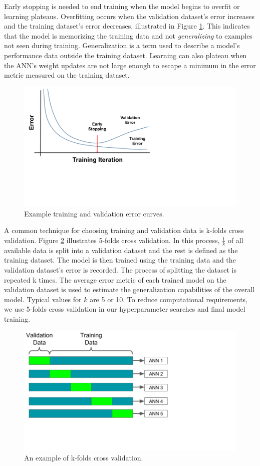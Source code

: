 Early stopping is needed to end training when the model begins to overfit or learning plateaus. Overfitting occurs when the validation dataset's error increases and the training dataset's error decreases, illustrated in Figure \ref{fig:training_testing_error}. This indicates that the model is memorizing the training data and not \textit{generalizing} to examples not seen during training. Generalization is a term used to describe a model's performance data outside the training dataset. Learning can also plateau when the ANN's weight updates are not large enough to escape a minimum in the error metric measured on the training dataset.

\begin{figure}[H]
	\centering
	\includegraphics[trim=0 190 390 0,clip,width=0.7\linewidth]{images/training_testing_error_v2}
	\caption{Example training and validation error curves.}
	\label{fig:training_testing_error}
\end{figure}

A common technique for choosing training and validation data is k-folds cross validation. Figure \ref{fig:kfolds} illustrates 5-folds cross validation. In this process, $\frac{1}{k}$ of all available data is split into a validation dataset and the rest is defined as the training dataset. The model is then trained using the training data and the validation dataset's error is recorded. The process of splitting the dataset is repeated k times. The average error metric of each trained model on the validation dataset is used to estimate the generalization capabilities of the overall model. Typical values for $k$ are 5 or 10. To reduce computational requirements, we use 5-folds cross validation in our hyperparameter searches and final model training. 


\begin{figure}[H]
	\centering
	\includegraphics[trim=0 140 310 0,clip,width=0.7\linewidth]{images/kfolds}
	\caption{An example of k-folds cross validation.}
	\label{fig:kfolds}
\end{figure}

